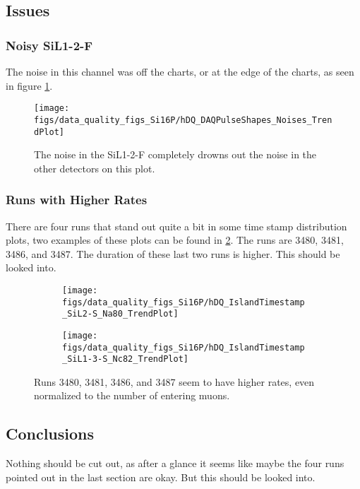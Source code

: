 \documentclass[a4paper]{article}
\begin{document}
\subsection{Issues}
\subsubsection{Noisy SiL1-2-F}
The noise in this channel was off the charts, or at the edge of the charts, as seen
in figure \ref{fig:si16p_noise}.

\begin{figure}
  \centering
  \texttt{[image: figs/data\_quality\_figs\_Si16P/hDQ\_DAQPulseShapes\_Noises\_TrendPlot]}
  \caption{The noise in the SiL1-2-F completely drowns out the noise in the other detectors on this plot.}
  \label{fig:si16p_noise}
\end{figure}


\subsubsection{Runs with Higher Rates}
There are four runs that stand out quite a bit in some time stamp distribution plots, two examples of these plots can
be found in \ref{fig:si16p_funnyruns}. The runs are 3480, 3481, 3486, and 3487. The duration of these last two runs is
higher. This should be looked into.

\begin{figure}
  \centering
  \begin{subfigure}{0.5\textwidth}
    \texttt{[image: figs/data\_quality\_figs\_Si16P/hDQ\_IslandTimestamp\_SiL2-S\_Na80\_TrendPlot]}
  \end{subfigure}%
  \begin{subfigure}{0.5\textwidth}
    \texttt{[image: figs/data\_quality\_figs\_Si16P/hDQ\_IslandTimestamp\_SiL1-3-S\_Nc82\_TrendPlot]}
  \end{subfigure}
  \caption{Runs 3480, 3481, 3486, and 3487 seem to have higher rates, even normalized to the number of entering muons.}
  \label{fig:si16p_funnyruns}
\end{figure}


\subsection{Conclusions}

Nothing should be cut out, as after a glance it seems like maybe the four runs pointed out in the last section are okay.
But this should be looked into.
\end{document}
